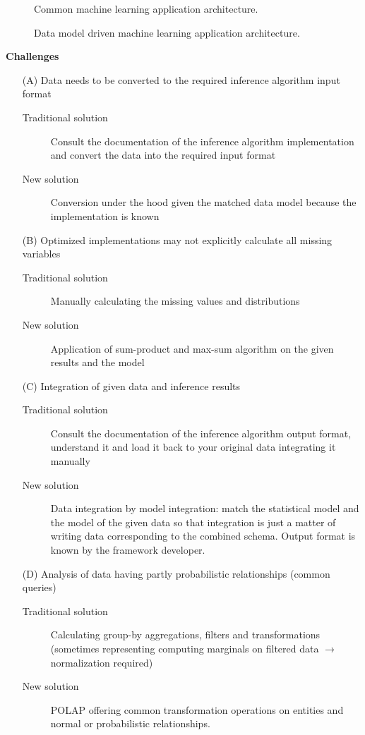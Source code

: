 \begin{figure}
\centering
\scalebox{\tikzScale}{\adjustTikzSize }
\caption{Common machine learning application architecture.}\label{fig:ml-application-architecture}
\end{figure}

\begin{figure}
\centering
\scalebox{\tikzScale}{\adjustTikzSize }
\caption{Data model driven machine learning application architecture.}\label{fig:ml-application-architecture-dm}
\end{figure}

\textbf{Challenges}
\begin{enumerate}
\item[(A)] Data needs to be converted to the required inference algorithm input format
	\begin{description}
	\item[Traditional solution] Consult the documentation of the inference algorithm implementation and convert the data into the required input format
	\item[New solution] Conversion under the hood given the matched data model because the implementation is known
	\end{description}
\item[(B)] Optimized implementations may not explicitly calculate all missing variables
	\begin{description}
	\item[Traditional solution] Manually calculating the missing values and distributions
	\item[New solution] Application of sum-product and max-sum algorithm on the given results and the model
	\end{description}
\item[(C)] Integration of given data and inference results
	\begin{description}
	\item[Traditional solution] Consult the documentation of the inference algorithm output format, understand it and load it back to your original data integrating it manually
	\item[New solution] Data integration by model integration: match the statistical model and the model of the given data so that integration is just a matter of writing data corresponding to the combined schema. Output format is known by the framework developer.
	\end{description}
\item[(D)] Analysis of data having partly probabilistic relationships (common queries)
	\begin{description}
	\item[Traditional solution] Calculating group-by aggregations, filters and transformations (sometimes representing computing marginals on filtered data $\rightarrow$ normalization required)
	\item[New solution] POLAP offering common transformation operations on entities and normal or probabilistic relationships.
	\end{description}
\end{enumerate}

